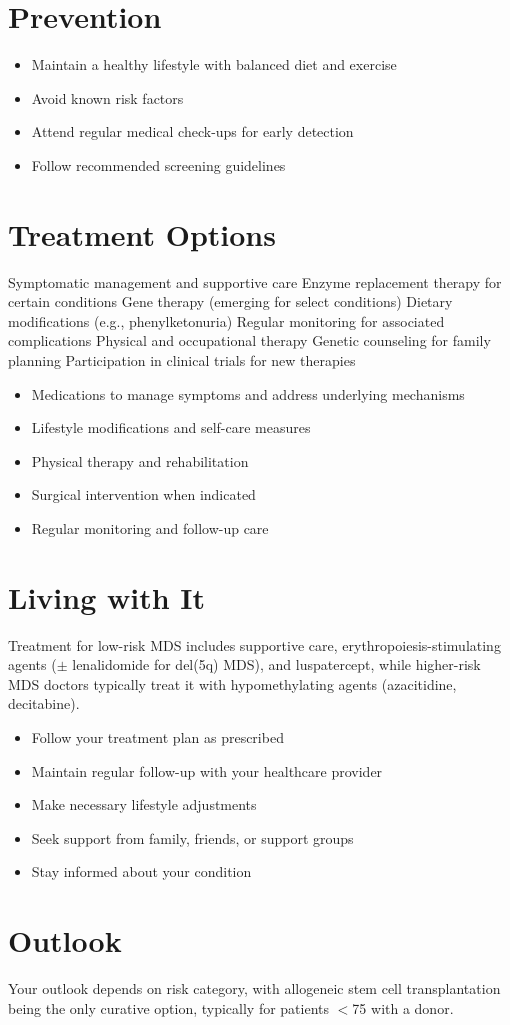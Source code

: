 \section{Prevention}
\begin{itemize}[noitemsep]
  \item Maintain a healthy lifestyle with balanced diet and exercise
  \item Avoid known risk factors
  \item Attend regular medical check-ups for early detection
  \item Follow recommended screening guidelines
\end{itemize}
\section{Treatment Options}
Symptomatic management and supportive care Enzyme replacement therapy for certain conditions Gene therapy (emerging for select conditions) Dietary modifications (e.g., phenylketonuria) Regular monitoring for associated complications Physical and occupational therapy Genetic counseling for family planning Participation in clinical trials for new therapies

\begin{itemize}[noitemsep]
  \item Medications to manage symptoms and address underlying mechanisms
  \item Lifestyle modifications and self-care measures
  \item Physical therapy and rehabilitation
  \item Surgical intervention when indicated
  \item Regular monitoring and follow-up care
\end{itemize}
\section{Living with It}
Treatment for low-risk MDS includes supportive care, erythropoiesis-stimulating agents ($\pm$ lenalidomide for del(5q) MDS), and luspatercept, while higher-risk MDS doctors typically treat it with hypomethylating agents (azacitidine, decitabine).

\begin{itemize}[noitemsep]
  \item Follow your treatment plan as prescribed
  \item Maintain regular follow-up with your healthcare provider
  \item Make necessary lifestyle adjustments
  \item Seek support from family, friends, or support groups
  \item Stay informed about your condition
\end{itemize}
\section{Outlook}
Your outlook depends on risk category, with allogeneic stem cell transplantation being the only curative option, typically for patients $<$75 with a donor.

